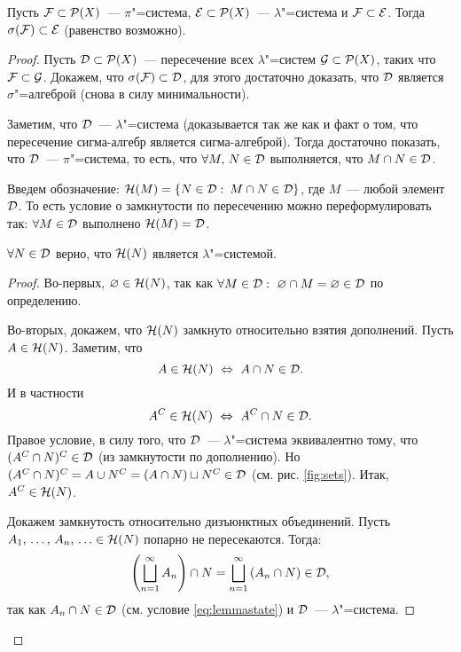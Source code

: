 \begin{theorem}[Дынкин]
    \label{theorem:dynkin}

    Пусть $\mathcal{F} \subset\mathcal{P}(X)$~--- $\pi$"=система, $\mathcal{E}\subset\mathcal{P}(X)$~--- $\lambda$"=система и
    $\mathcal{F} \subset\mathcal{E}$. Тогда $\sigma(\mathcal{F} )\subset\mathcal{E}$ (равенство возможно).

    \begin{proof}
        Пусть $\mathcal{D}\subset \mathcal{P}(X)$~--- пересечение всех $\lambda$"=систем $\mathcal{G}\subset\mathcal{P}(X)$, 
        таких что $\mathcal{F} \subset\mathcal{G}$. Докажем, что $\sigma(\mathcal{F} )\subset\mathcal{D}$, для этого достаточно доказать, 
        что $\mathcal{D}$ является $\sigma$"=алгеброй (снова в силу минимальности).

        Заметим, что $\mathcal{D}$~--- $\lambda$"=система (доказывается так же как и факт о том, что пересечение сигма-алгебр является
        сигма-алгеброй). Тогда достаточно показать, что $\mathcal{D}$~--- $\pi$"=система, то есть, что 
        $\forall M,\, N\in\mathcal{D}$ выполняется, что $M\cap N\in\mathcal{D}$.

        Введем обозначение: $\mathcal{H}(M)=\{N\in\mathcal{D}:\: M\cap N\in\mathcal{D}\}$, где $M$~--- любой элемент $\mathcal{D}$. То есть 
        условие о замкнутости по пересечению можно переформулировать так: $\forall M\in\mathcal{D}$ выполнено $\mathcal{H}(M)=\mathcal{D}$.

        \begin{lemma}
            $\forall N\in\mathcal{D}$ верно, что $\mathcal{H}(N)$ является $\lambda$"=системой.

            \begin{proof}
                Во-первых, $\varnothing\in\mathcal{H}(N)$, так как $\forall M\in\mathcal{D}:\ \varnothing\cap M=\varnothing\in\mathcal{D}$ по определению.

                Во-вторых, докажем, что $\mathcal{H}(N)$ замкнуто относительно взятия дополнений. Пусть $A\in\mathcal{H}(N)$. 
                Заметим, что
                \begin{equation}
                    \label{eq:lemmastate}
                    A\in\mathcal{H}(N)\ \Leftrightarrow\ A\cap N\in\mathcal{D}.
                \end{equation}
                И в частности 
                \[
                    A^C\in\CH(N)\ \Leftrightarrow\ A^C\cap N\in\CD.    
                \]
                Правое условие, в силу того, что $\mathcal{D}$~--- $\lambda$"=система эквивалентно тому, что 
                $(A^C\cap N)^C\in\mathcal{D}$ (из замкнутости по дополнению). Но $(A^C\cap N)^C=A\cup N^C=(A\cap N)\sqcup N^C\in\mathcal{D}$ 
                (см. рис. \ref{fig:sets}). Итак, $A^C\in\mathcal{H}(N)$.

                Докажем замкнутость относительно дизъюнктных объединений. Пусть 
                $A_1,\,\ldots,\,A_n,\,\ldots\in\mathcal{H}(N)$ попарно не пересекаются. Тогда:
                \[
                    \left(\bigsqcup_{n=1}^{\infty}A_n\right)\cap N=\bigsqcup_{n=1}^{\infty}\left(A_n\cap N\right)\in \mathcal{D},
                \]
                так как $A_n\cap N\in\mathcal{D}$ (см. условие \eqref{eq:lemmastate}) и $\mathcal{D}$~--- $\lambda$"=система.


\end{proof}
\end{lemma}
\end{proof}
\end{theorem}
